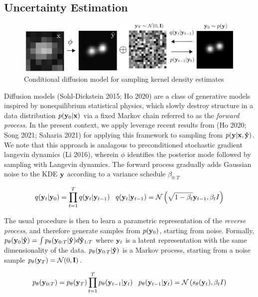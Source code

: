 \documentclass{article}
\begin{document}
\subsection{Uncertainty Estimation}

\begin{figure}
\includegraphics[scale=4.5]{Denoise.png}
\caption{Conditional diffusion model for sampling kernel density estimates}
\end{figure}

Diffusion models (Sohl-Dickstein 2015; Ho 2020) are a class of generative models inspired by nonequilibrium statistical physics, which slowly destroy structure in a data distribution $p(\bold{y}_{0}|\bold{x})$ via a fixed Markov chain referred to as the \emph{forward process}. In the present context, we apply leverage recent results from (Ho 2020; Song 2021; Saharia 2021) for applying this framework to sampling from $p(\bold{y}|\bold{x},\bold{\hat{y}})$. We note that this approach is analagous to preconditioned stochastic gradient langevin dynamics (Li 2016), wherein $\phi$ identifies the posterior mode followed by sampling with Langevin dynamics. The forward process gradually adds Gaussian noise to the KDE $\bold{y}$ according to a variance schedule $\beta_{0:T}$

\begin{equation}
q(\bold{y}_{t}|\bold{y}_{0}) = \prod_{t=1}^{T}q(\bold{y}_{t}|\bold{y}_{t-1}) \;\;\; q(\bold{y}_{t}|\bold{y}_{t-1}) = \mathcal{N}\left(\sqrt{1-\beta_{t}}\bold{y}_{t-1},\beta_t I\right)
\end{equation}

The usual procedure is then to learn a parametric representation of the \emph{reverse process}, and therefore generate samples from  $p(\bold{y}_{0})$, starting from noise. Formally, $p_{\theta}(\bold{y}_{0}|\bold{\hat{y}}) = \int p_{\theta}(\bold{y}_{0:T}|\bold{\hat{y}})d\bold{\hat{y}}_{1:T}$ where $\bold{y}_{t}$ is a latent representation with the same dimensionality of the data.  $p_{\theta}(\bold{y}_{0:T}|\bold{\hat{y}})$ is a Markov process, starting from a noise sample $p_{\theta}(\bold{y}_{T}) = \mathcal{N}(0,\bold{I})$. 

\begin{equation}
p_{\theta}(\bold{y}_{0:T}) = p_{\theta}(\bold{y}_{T})\prod_{t=1}^{T} p_{\theta}(\bold{y}_{t-1}|\bold{y}_{t}) \;\;\; p_{\theta}(\bold{y}_{t-1}|\bold{y}_{t}) = \mathcal{N}\left(s_{\theta}(\bold{y}_{t}),\beta_{t}I\right)
\end{equation}
\end{document}
